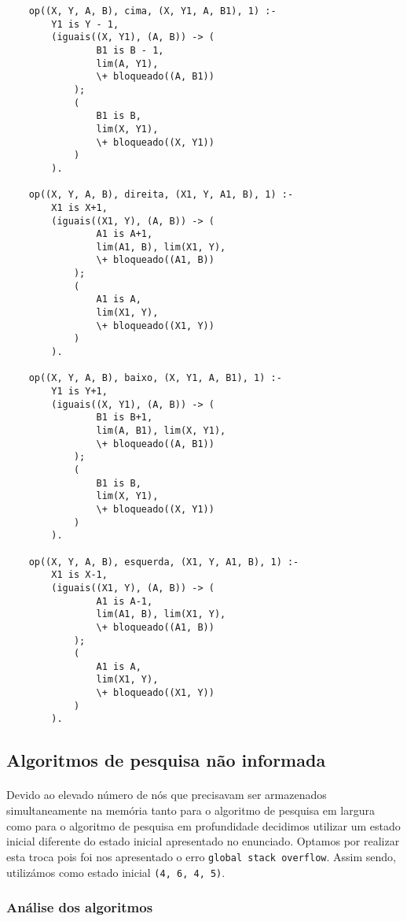 \documentclass{article}
\begin{document}
\begin{verbatim}
    op((X, Y, A, B), cima, (X, Y1, A, B1), 1) :-
        Y1 is Y - 1,
        (iguais((X, Y1), (A, B)) -> (
                B1 is B - 1,
                lim(A, Y1),
                \+ bloqueado((A, B1))
            );
            (
                B1 is B,
                lim(X, Y1),
                \+ bloqueado((X, Y1))
            )
        ).
    
    op((X, Y, A, B), direita, (X1, Y, A1, B), 1) :-
        X1 is X+1,
        (iguais((X1, Y), (A, B)) -> (
                A1 is A+1,
                lim(A1, B), lim(X1, Y),
                \+ bloqueado((A1, B))
            );
            (
                A1 is A,
                lim(X1, Y),
                \+ bloqueado((X1, Y))
            )
        ).
    
    op((X, Y, A, B), baixo, (X, Y1, A, B1), 1) :-
        Y1 is Y+1,
        (iguais((X, Y1), (A, B)) -> (
                B1 is B+1,
                lim(A, B1), lim(X, Y1),
                \+ bloqueado((A, B1))
            );
            (
                B1 is B,
                lim(X, Y1),
                \+ bloqueado((X, Y1))
            )
        ).
    
    op((X, Y, A, B), esquerda, (X1, Y, A1, B), 1) :-
        X1 is X-1,
        (iguais((X1, Y), (A, B)) -> (
                A1 is A-1,
                lim(A1, B), lim(X1, Y),
                \+ bloqueado((A1, B))
            );
            (
                A1 is A,
                lim(X1, Y),
                \+ bloqueado((X1, Y))
            )
        ).
\end{verbatim}

\subsection{Algoritmos de pesquisa não informada}
\paragraph{} Devido ao elevado número de nós que precisavam ser armazenados simultaneamente na memória tanto para o algoritmo de pesquisa em largura como para o algoritmo de pesquisa em profundidade decidimos utilizar um estado inicial diferente do estado inicial apresentado no enunciado. Optamos por realizar esta troca pois foi nos apresentado o erro \texttt{global stack overflow}. Assim sendo, utilizámos como estado inicial \texttt{(4, 6, 4, 5)}. 

\subsubsection{Análise dos algoritmos}
\end{document}
